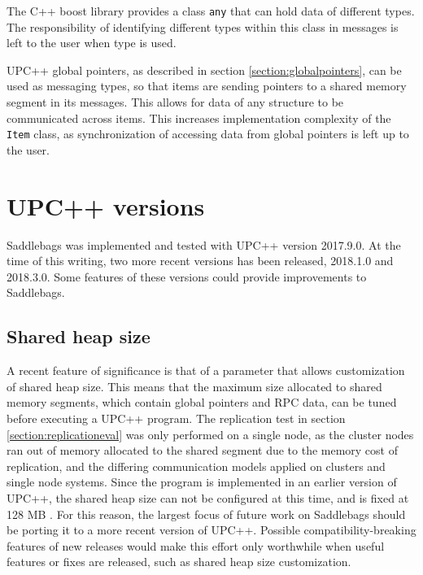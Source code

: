 \documentclass{uit-report}
\begin{document}
The C++ boost library provides a class \texttt{any} \cite{boostany} that can hold data of different types. The responsibility of identifying different types within this class in messages is left to the user when type is used.

UPC++ global pointers, as described in section \ref{section:globalpointers}, can be used as messaging types, so that items are sending pointers to a shared memory segment in its messages. This allows for data of any structure to be communicated across items. This increases implementation complexity of the \texttt{Item} class, as synchronization of accessing data from global pointers is left up to the user.



\section{UPC++ versions}
Saddlebags was implemented and tested with UPC++ version 2017.9.0. At the time of this writing, two more recent versions has been released, 2018.1.0 and 2018.3.0. Some features of these versions could provide improvements to Saddlebags.

\subsection{Shared heap size}
A recent feature of significance is that of a parameter that allows customization of shared heap size. This means that the maximum size allocated to shared memory segments, which contain global pointers and RPC data, can be tuned before executing a UPC++ program. The replication test in section \ref{section:replicationeval} was only performed on a single node, as the cluster nodes ran out of memory allocated to the shared segment due to the memory cost of replication, and the differing communication models applied on clusters and single node systems. Since the program is implemented in an earlier version of UPC++, the shared heap size can not be configured at this time, and is fixed at 128 MB \cite{upcxxguide20183}. For this reason, the largest focus of future work on Saddlebags should be porting it to a more recent version of UPC++. Possible compatibility-breaking features of new releases would make this effort only worthwhile when useful features or fixes are released, such as shared heap size customization.
\end{document}
